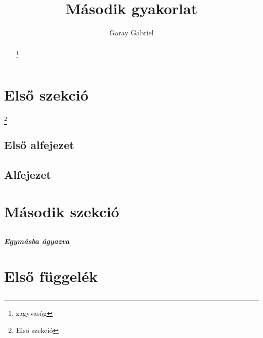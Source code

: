 \documentclass[twocolumn]{article}
\title{Második gyakorlat}
\author{Garay Gabriel}
\begin{document}
\maketitle
\renewcommand{\thefootnote}{\fnsymbol{footnote}}
\begin{abstract}
\hulipsum[1-2]
\footnote{zagyvaság}
\end{abstract}


\newpage
\setcounter{tocdepth}{5}
\tableofcontents
{}
\clearpage

\section[Első]{Első szekció}
\footnote{Első szekció}
\subsection{Első alfejezet}
\hulipsum[1-2]
\newpage

\subsection{Alfejezet}
\hulipsum[3-4]

\newpage
\setcounter{secnumdepth}{5}
\section{Második szekció}
\subsection{}
\subsubsection{}
\paragraph{}
\subparagraph{Egymásba ágyazva}

\appendix
\section{Első függelék}
\subsection{}
\subsection{}
\end{document}
